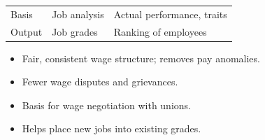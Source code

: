 {{\begin{tabularx}{\linewidth}{@{}L{1.5cm}XX@{}}
Basis & Job analysis & Actual performance, traits \\
Output & Job grades & Ranking of employees \\
\bottomrule
\end{tabularx}}
\begin{itemize}
  \item Fair, consistent wage structure; removes pay anomalies.
  \item Fewer wage disputes and grievances.
  \item Basis for wage negotiation with unions.
  \item Helps place new jobs into existing grades.
\end{itemize}}

{\color{sub}\footnotesize {} }
